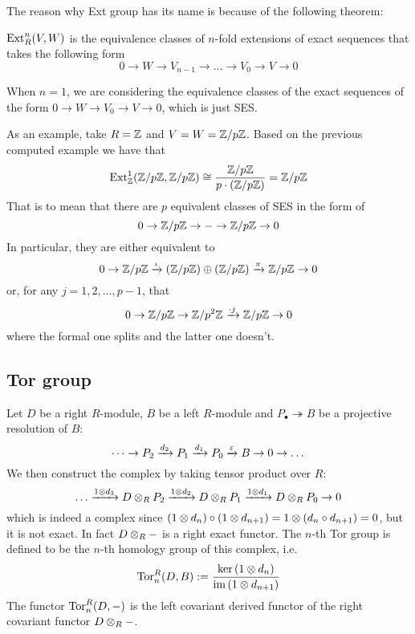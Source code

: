 \begin{re}
    The reason why Ext group has its name is because of the following theorem:

    \medskip

    \begin{thm}
        $\operatorname{Ext}^n_R(V,W)$ is the equivalence classes of $n$-fold extensions of exact sequences that takes the following form 
        \[0 \to W \to V_{n-1}\to \dots \to V_0 \to V \to 0\]
    \end{thm}

    When $n=1$, we are considering the equivalence classes of the exact sequences of the form $0\to W \to V_0 \to V \to 0$, which is just SES.

    As an example, take $R={\mathbb Z}$ and $V=W = {\mathbb Z}/p{\mathbb Z}$. Based on the previous computed example we have that 
    \[\operatorname{Ext}_{\mathbb Z}^1({\mathbb Z}/p{\mathbb Z}, {\mathbb Z}/p{\mathbb Z}) \cong \frac{{\mathbb Z}/p{\mathbb Z}}{p\cdot ({\mathbb Z}/p{\mathbb Z})} = {\mathbb Z}/p{\mathbb Z}\]
    That is to mean that there are $p$ equivalent classes of SES in the form of 
    \[0 \to {\mathbb Z}/p{\mathbb Z} \to - \to {\mathbb Z}/p{\mathbb Z} \to 0\]
    In particular, they are either equivalent to 
    \[0 \to {\mathbb Z}/p{\mathbb Z} \xrightarrow{\iota} ({\mathbb Z}/p{\mathbb Z})\oplus ({\mathbb Z}/p{\mathbb Z}) \xrightarrow{\pi} {\mathbb Z}/p{\mathbb Z} \to 0\]
    or, for any $j=1,2, \dots, p-1$, that 
    \[0 \to {\mathbb Z}/p{\mathbb Z} \to {\mathbb Z}/p^2{\mathbb Z} \xrightarrow{\cdot j} {\mathbb Z}/p{\mathbb Z} \to 0\]
    where the formal one splits and the latter one doesn't.
\end{re}


\newpage
\subsection{Tor group}
\begin{defn} 
    Let $D$ be a right $R$-module, $B$ be a left $R$-module and $P_\bullet \twoheadrightarrow B$ be a projective resolution of $B$:
    \[\dots \to P_2\xrightarrow{d_2} P_1 \xrightarrow{d_1} P_0 \xrightarrow{\varepsilon} B \to 0 \to \dots\]
    We then construct the complex by taking tensor product over $R$:
    \[\dots \xrightarrow{1\otimes d_3} D\otimes_R P_2 \xrightarrow{1\otimes d_2} D\otimes_R P_1 \xrightarrow{1\otimes d_1} D\otimes_R P_0 \to 0\]
    which is indeed a complex since $(1\otimes d_n)\circ (1\otimes d_{n+1}) = 1\otimes (d_n\circ d_{n+1}) = 0$, but it is not exact. In fact $D\otimes_R -$ is a right exact functor. The $n$-th Tor group is defined to be the $n$-th homology group of this complex, i.e.
    \[\operatorname{Tor}_n^R(D,B) := \frac{\ker \left(1\otimes d_n\right)}{\operatorname{im} \left(1\otimes d_{n+1}\right)}\]
    The functor $\operatorname{Tor}_n^R(D, -)$ is the left covariant derived functor of the right covariant functor $D\otimes_R -$.
\end{defn}

